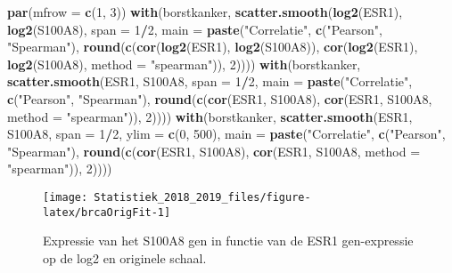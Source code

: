 \documentclass[12pt,dutch,coursenotes]{book}
\newenvironment{Shaded}{\begin{snugshade}}{\end{snugshade}}
\newcommand{\KeywordTok}[1]{\textcolor[rgb]{0.13,0.29,0.53}{\textbf{#1}}}
\newcommand{\DataTypeTok}[1]{\textcolor[rgb]{0.13,0.29,0.53}{#1}}
\newcommand{\DecValTok}[1]{\textcolor[rgb]{0.00,0.00,0.81}{#1}}
\newcommand{\StringTok}[1]{\textcolor[rgb]{0.31,0.60,0.02}{#1}}
\newcommand{\OperatorTok}[1]{\textcolor[rgb]{0.81,0.36,0.00}{\textbf{#1}}}
\newcommand{\NormalTok}[1]{#1}
\theoremstyle{definition}
\theoremstyle{definition}
\theoremstyle{definition}
\theoremstyle{remark}
\begin{document}
\begin{Shaded}
\begin{Highlighting}[]
\KeywordTok{par}\NormalTok{(}\DataTypeTok{mfrow =} \KeywordTok{c}\NormalTok{(}\DecValTok{1}\NormalTok{, }\DecValTok{3}\NormalTok{))}
\KeywordTok{with}\NormalTok{(borstkanker, }\KeywordTok{scatter.smooth}\NormalTok{(}\KeywordTok{log2}\NormalTok{(ESR1), }\KeywordTok{log2}\NormalTok{(S100A8), }
    \DataTypeTok{span =} \DecValTok{1}\OperatorTok{/}\DecValTok{2}\NormalTok{, }\DataTypeTok{main =} \KeywordTok{paste}\NormalTok{(}\StringTok{"Correlatie"}\NormalTok{, }\KeywordTok{c}\NormalTok{(}\StringTok{"Pearson"}\NormalTok{, }
        \StringTok{"Spearman"}\NormalTok{), }\KeywordTok{round}\NormalTok{(}\KeywordTok{c}\NormalTok{(}\KeywordTok{cor}\NormalTok{(}\KeywordTok{log2}\NormalTok{(ESR1), }\KeywordTok{log2}\NormalTok{(S100A8)), }
        \KeywordTok{cor}\NormalTok{(}\KeywordTok{log2}\NormalTok{(ESR1), }\KeywordTok{log2}\NormalTok{(S100A8), }\DataTypeTok{method =} \StringTok{"spearman"}\NormalTok{)), }
        \DecValTok{2}\NormalTok{))))}
\KeywordTok{with}\NormalTok{(borstkanker, }\KeywordTok{scatter.smooth}\NormalTok{(ESR1, S100A8, }\DataTypeTok{span =} \DecValTok{1}\OperatorTok{/}\DecValTok{2}\NormalTok{, }
    \DataTypeTok{main =} \KeywordTok{paste}\NormalTok{(}\StringTok{"Correlatie"}\NormalTok{, }\KeywordTok{c}\NormalTok{(}\StringTok{"Pearson"}\NormalTok{, }\StringTok{"Spearman"}\NormalTok{), }
        \KeywordTok{round}\NormalTok{(}\KeywordTok{c}\NormalTok{(}\KeywordTok{cor}\NormalTok{(ESR1, S100A8), }\KeywordTok{cor}\NormalTok{(ESR1, S100A8, }
            \DataTypeTok{method =} \StringTok{"spearman"}\NormalTok{)), }\DecValTok{2}\NormalTok{))))}
\KeywordTok{with}\NormalTok{(borstkanker, }\KeywordTok{scatter.smooth}\NormalTok{(ESR1, S100A8, }\DataTypeTok{span =} \DecValTok{1}\OperatorTok{/}\DecValTok{2}\NormalTok{, }
    \DataTypeTok{ylim =} \KeywordTok{c}\NormalTok{(}\DecValTok{0}\NormalTok{, }\DecValTok{500}\NormalTok{), }\DataTypeTok{main =} \KeywordTok{paste}\NormalTok{(}\StringTok{"Correlatie"}\NormalTok{, }\KeywordTok{c}\NormalTok{(}\StringTok{"Pearson"}\NormalTok{, }
        \StringTok{"Spearman"}\NormalTok{), }\KeywordTok{round}\NormalTok{(}\KeywordTok{c}\NormalTok{(}\KeywordTok{cor}\NormalTok{(ESR1, S100A8), }\KeywordTok{cor}\NormalTok{(ESR1, }
\NormalTok{        S100A8, }\DataTypeTok{method =} \StringTok{"spearman"}\NormalTok{)), }\DecValTok{2}\NormalTok{))))}
\end{Highlighting}
\end{Shaded}

\begin{figure}

{\centering \texttt{[image: Statistiek\_2018\_2019\_files/figure-latex/brcaOrigFit-1]} 

}

\caption{Expressie van het S100A8 gen in functie van de ESR1 gen-expressie op de log2 en originele schaal.}\label{fig:brcaOrigFit}
\end{figure}
\end{document}
